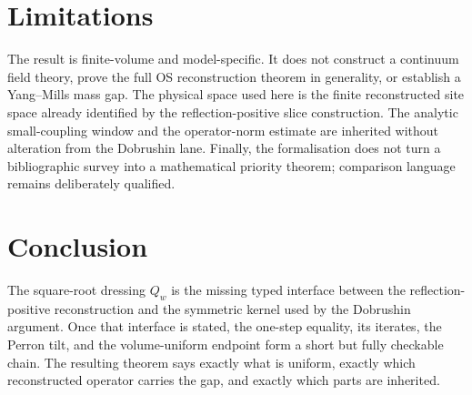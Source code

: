 \documentclass[11pt]{article}
\begin{document}
\section{Limitations}

The result is finite-volume and model-specific.  It does not construct a
continuum field theory, prove the full OS reconstruction theorem in generality,
or establish a Yang--Mills mass gap.  The physical space used here is the
finite reconstructed site space already identified by the reflection-positive
slice construction.  The analytic small-coupling window and the operator-norm
estimate are inherited without alteration from the Dobrushin lane.  Finally,
the formalisation does not turn a bibliographic survey into a mathematical
priority theorem; comparison language remains deliberately qualified.

\section{Conclusion}

The square-root dressing $Q_w$ is the missing typed interface between the
reflection-positive reconstruction and the symmetric kernel used by the
Dobrushin argument.  Once that interface is stated, the one-step equality,
its iterates, the Perron tilt, and the volume-uniform endpoint form a short but
fully checkable chain.  The resulting theorem says exactly what is uniform,
exactly which reconstructed operator carries the gap, and exactly which parts
are inherited.
\end{document}
